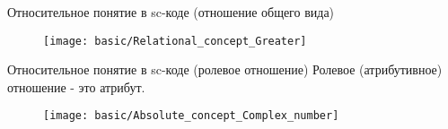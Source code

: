 \begin{frame}{Относительное понятие в sc-коде (отношение общего вида)}
  \begin{center}
    \begin{figure}
      \texttt{[image: basic/Relational\_concept\_Greater]}
    \end{figure}
  \end{center}
\end{frame}

\begin{frame}{Относительное понятие в sc-коде (ролевое отношение)}
  Ролевое (атрибутивное) отношение - это атрибут.

  \begin{center}
    \begin{figure}
      \texttt{[image: basic/Absolute\_concept\_Complex\_number]}
    \end{figure}
  \end{center}
\end{frame}


